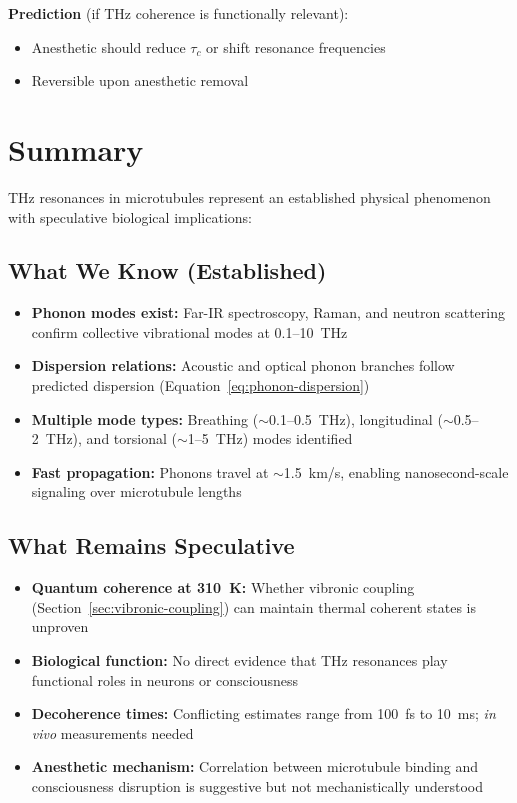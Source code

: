 \textbf{Prediction} (if THz coherence is functionally relevant):
\begin{itemize}
\item Anesthetic should reduce $\tau_c$ or shift resonance frequencies
\item Reversible upon anesthetic removal
\end{itemize}




\section{Summary}
\label{sec:summary}

THz resonances in microtubules represent an established physical phenomenon with speculative biological implications:

\subsection{What We Know (Established)}

\begin{itemize}
\item \textbf{Phonon modes exist:} Far-IR spectroscopy, Raman, and neutron scattering confirm collective vibrational modes at 0.1--10~THz
\item \textbf{Dispersion relations:} Acoustic and optical phonon branches follow predicted dispersion (Equation~\ref{eq:phonon-dispersion})
\item \textbf{Multiple mode types:} Breathing ($\sim$0.1--0.5~THz), longitudinal ($\sim$0.5--2~THz), and torsional ($\sim$1--5~THz) modes identified
\item \textbf{Fast propagation:} Phonons travel at $\sim$1.5~km/s, enabling nanosecond-scale signaling over microtubule lengths
\end{itemize}

\subsection{What Remains Speculative}

\begin{itemize}
\item \textbf{Quantum coherence at 310~K:} Whether vibronic coupling (Section~\ref{sec:vibronic-coupling}) can maintain thermal coherent states is unproven
\item \textbf{Biological function:} No direct evidence that THz resonances play functional roles in neurons or consciousness
\item \textbf{Decoherence times:} Conflicting estimates range from 100~fs to 10~ms; \textit{in vivo} measurements needed
\item \textbf{Anesthetic mechanism:} Correlation between microtubule binding and consciousness disruption is suggestive but not mechanistically understood
\end{itemize}

